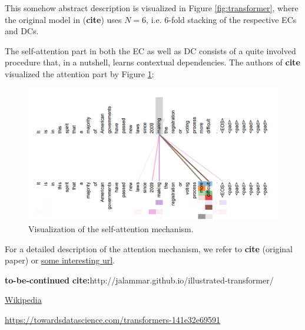 \documentclass[11pt,a4paper]{article}
\begin{document}
This somehow abstract description is visualized in Figure \ref{fig:transformer}, where the original model in (\textbf{cite}) uses $N=6$, i.e. 6-fold stacking of the respective ECs and DCs.

The self-attention part in both the EC as well as DC consists of a quite involved procedure that, in a nutshell, learns contextual dependencies. The authors of \textbf{cite} visualized the attention part by Figure \ref{fig:attention}:

\begin{figure}[h]
    \centering
    \includegraphics[scale=0.7]{paper/images/attention.PNG}
    \caption{Visualization of the self-attention mechanism.}
    \label{fig:attention}
\end{figure}

For a detailed description of the attention mechanism, we refer to \textbf{cite} (original paper) or \href{some interesting url}{some interesting url}.

\textbf{to-be-continued}
\textbf{cite:}http://jalammar.github.io/illustrated-transformer/


\href{https://en.wikipedia.org/wiki/Transformer_(machine_learning_model)}{Wikipedia}

\href{https://towardsdatascience.com/transformers-141e32e69591}{https://towardsdatascience.com/transformers-141e32e69591}
\end{document}
